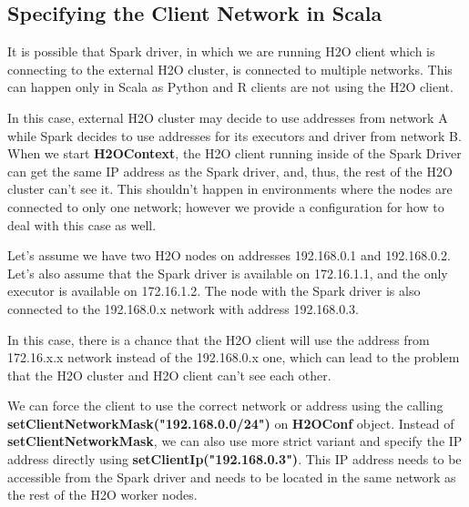\subsection{Specifying the Client Network in Scala}
\label{subsection:specify_ip}

It is possible that Spark driver, in which we are running H2O client which is connecting to the external H2O cluster, is
connected to multiple networks. This can happen only in Scala as Python and R clients are not using the H2O client.

In this case, external H2O cluster may decide to use addresses from network A while Spark decides to use
addresses for its executors and driver from network B. When we start \textbf{H2OContext}, the H2O
client running inside of the Spark Driver can get the same IP address as the Spark driver, and, thus, the rest
of the H2O cluster can't see it. This shouldn't happen in environments where the nodes are connected to only one
network; however we provide a configuration for how to deal with this case as well.

Let's assume we have two H2O nodes on addresses 192.168.0.1 and 192.168.0.2. Let's also assume that the Spark driver
is available on 172.16.1.1, and the only executor is available on 172.16.1.2. The node with the Spark driver
is also connected to the 192.168.0.x network with address 192.168.0.3.

In this case, there is a chance that the H2O client will use the address from 172.16.x.x network instead
of the 192.168.0.x one, which can lead to the problem that the H2O cluster and H2O client can't see each other.

We can force the client to use the correct network or address using the calling \textbf{setClientNetworkMask("192.168.0.0/24")}
on \textbf{H2OConf} object. Instead of \textbf{setClientNetworkMask}, we can also use more strict variant and specify
the IP address directly using \textbf{setClientIp("192.168.0.3")}. This IP address needs to be accessible from the
Spark driver and needs to be located in the same network as the rest of the H2O worker nodes.
